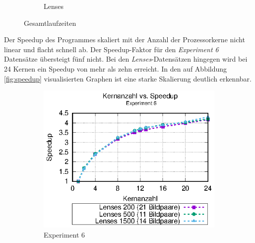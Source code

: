 \begin{center}
\begin{figure}
\begin{subfigure}[b]{0.49\textwidth}
			\caption[Lenses]{Lenses}
			\label{fig:times_lenses}
		\end{subfigure}
		\caption{Gesamtlaufzeiten}
		\label{fig:gesamtlaufzeiten}
	\end{figure}
\end{center}

Der Speedup des Programmes skaliert mit der Anzahl der Prozessorkerne nicht linear und flacht schnell ab. Der Speedup-Faktor für den \textit{Experiment 6} Datensätze übersteigt fünf nicht. Bei den \textit{Lenses}-Da\-ten\-sä\-tzen hingegen wird bei 24 Kernen ein Speedup von mehr als zehn erreicht. In den auf Abbildung \ref{fig:speedup} visualisierten Graphen ist eine starke Skalierung deutlich erkennbar. 

\begin{center}
	\begin{figure}
		\begin{subfigure}[b]{0.49\textwidth}
			\centering
			\includegraphics[width=\textwidth]{pdf/speedup_exp6}
			\caption[Experiment 6]{Experiment 6}
			\label{fig:speedup_exp6}
		\end{subfigure}
		\hfill
		\begin{subfigure}[b]{0.49\textwidth}
			\centering

\end{subfigure}
\end{figure}
\end{center}
